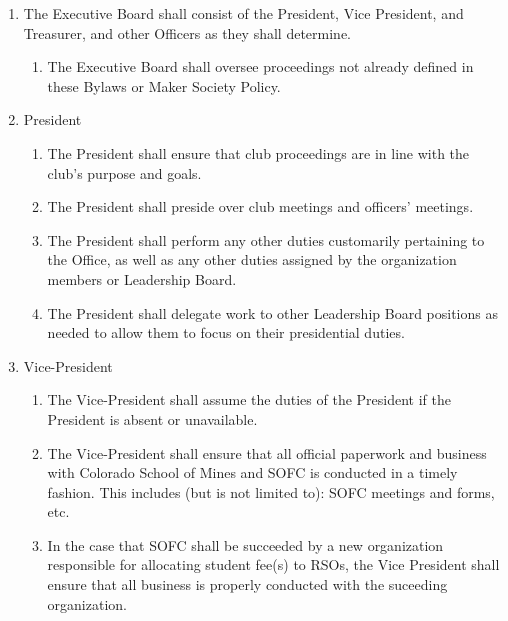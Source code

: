 \documentclass[12pt,letterpaper]{article}
\begin{document}
\begin{enumerate}[label=\Alph*.]
    \item The Executive Board shall consist of the President, Vice President, and Treasurer, and other Officers as they shall determine.
    \begin{enumerate}[label=\arabic*)]
        \item The Executive Board shall oversee proceedings not already defined in these Bylaws or Maker Society Policy. 
    \end{enumerate}
    
    \item President
    \begin{enumerate}[label=\arabic*)]
        \item The President shall ensure that club proceedings are in line with the club’s purpose and goals.
        \item The President shall preside over club meetings and officers’ meetings.
        \item The President shall perform any other duties customarily pertaining to the Office, as well as any other duties assigned by the organization members or Leadership Board.
        \item The President shall delegate work to other Leadership Board positions as needed to allow them to focus on their presidential duties.
    \end{enumerate}
    
    \item Vice-President
    \begin{enumerate}[label=\arabic*)]
        \item The Vice-President shall assume the duties of the President if the President is absent or unavailable.
        \item The Vice-President shall ensure that all official paperwork and business with Colorado School of Mines and SOFC is conducted in a timely fashion. This includes (but is not limited to): SOFC meetings and forms, etc. 
        \item In the case that SOFC shall be succeeded by a new organization responsible for allocating student fee(s) to RSOs, the Vice President shall ensure that all business is properly conducted with the suceeding organization.
    \end{enumerate}


\end{enumerate}
\end{document}
